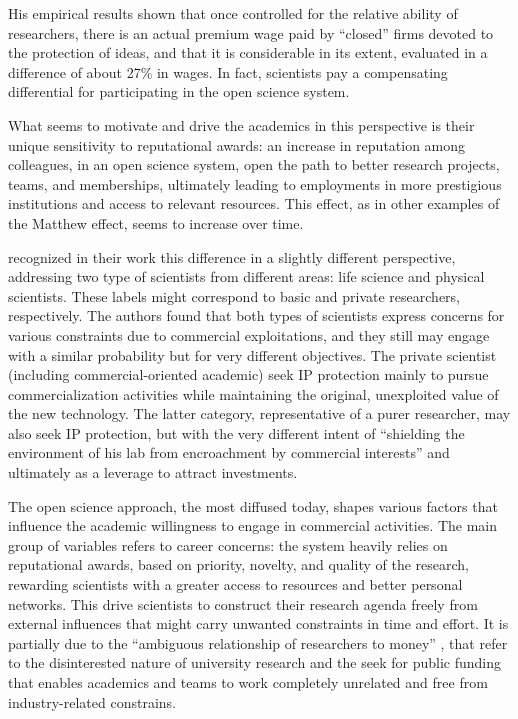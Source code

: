 His empirical results shown that once controlled for the relative ability of researchers, there is an actual premium wage paid by \enquote{closed} firms devoted to the protection of ideas, and that it is considerable in its extent, evaluated in a difference of about 27\% in wages. In fact, scientists pay a compensating differential for participating in the open science system. 

What seems to motivate and drive the academics in this perspective is their unique sensitivity to reputational awards: an increase in reputation among colleagues, in an open science system, open the path to better research projects, teams, and memberships, ultimately leading to employments in more prestigious institutions and access to relevant resources. This effect, as in other examples of the Matthew effect, seems to increase over time.

\citet{OwenSmith2001} recognized in their work this difference in a slightly different perspective, addressing two type of scientists from different areas: life science and physical scientists. These labels might correspond to basic and private researchers, respectively. The authors found that both types of scientists express concerns for various constraints due to commercial exploitations, and they still may engage with a similar probability but for very different objectives. The private scientist (including commercial-oriented academic) seek IP protection mainly to pursue commercialization activities while maintaining the original, unexploited value of the new technology. The latter category, representative of a purer researcher, may also seek IP protection, but with the very different intent of \enquote{shielding the environment of his lab from encroachment by commercial interests} and ultimately as a leverage to attract investments.

The open science approach, the most diffused today, shapes various factors that influence the academic willingness to engage in commercial activities. The main group of variables refers to career concerns: the system heavily relies on reputational awards, based on priority, novelty, and quality of the research, rewarding scientists with a greater access to resources and better personal networks. This drive scientists to construct their research agenda freely from external influences that might carry unwanted constraints in time and effort. It is partially due to the \enquote{ambiguous relationship of researchers to money} \citep{OShea2004}, that refer to the disinterested nature of university research and the seek for public funding that enables academics and teams to work completely unrelated and free from industry-related constrains. 

